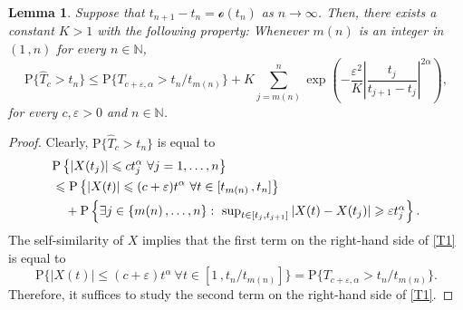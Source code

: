 \documentclass[reqno]{amsart}
\newcommand{\<}{\langle}
\renewcommand{\>}{\rangle}
\newcommand{\N}{\mathbb{N}}
\renewcommand{\P}{\mathrm{P}}
\newcommand{\1}{\mathbb{1}}
\renewcommand{\ge}{\geqslant}
\renewcommand{\le}{\leqslant}
\newtheorem{lemma}[stat]{Lemma}
\theoremstyle{definition}
\numberwithin{equation}{section}
\begin{document}
\begin{lemma}\label{lem:discrete}
	Suppose that $t_{n+1}-t_n = \mathcal{o}(t_n)$ as $n\to\infty$.
	Then, there exists a constant $K >1$ with the following property:
	Whenever $m(n)$ is an integer in $(1\,,n)$ for every $n\in\N$,
	\[
		\P\{\hat{T}_c > t_n\}
		\le \P\{ T_{c+\varepsilon,\alpha} > t_n/t_{m(n)}\}
		+ K\sum_{j=m(n)}^n \exp\left(- \frac{\varepsilon^2}{K}
		\left|\frac{t_j}{t_{j+1}-t_j}\right|^{2\alpha} \right),
	\]
	for every $c,\varepsilon>0$ and $n\in\N$.
\end{lemma}

\begin{proof}
	Clearly, $\P\{\hat{T}_c>t_n\}$ is equal to
	\begin{align}\notag
		&\P\left\{ |X(t_j)|\le  ct_j^\alpha\ \forall j=1,\ldots,n\right\}\\
			&\le \P\left\{|X(t)|\le (c+\varepsilon)t^\alpha\ \forall t\in[t_{m(n)}\,,t_n]\right\}
			\label{T1}\\\notag
		&\textstyle\quad + \P\left\{\exists j\in\{m(n)\,,\ldots,n\}:\ 
			\sup_{t\in[t_j,t_{j+1}]} |X(t)-X(t_j)| \ge \varepsilon t_j^\alpha\right\}.
	\end{align}
	The self-similarity of $X$ implies that the first term on the right-hand side of \eqref{T1}
	is equal to
	\[
		\P\{|X(t)|\le (c+\varepsilon)t^\alpha\ 
		\forall t\in[1\,,t_n/t_{m(n)}]\}
		=\P\{T_{c+\varepsilon,\alpha}>t_n/t_{m(n)}\}.
	\]
	Therefore, it suffices to study the second term on the right-hand side of \eqref{T1}.
	

\end{proof}
\end{document}
